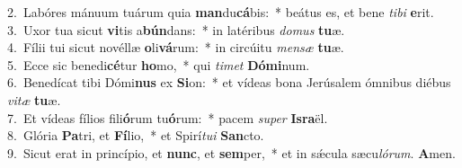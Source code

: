 {2.~}Labóres mánuum tuárum quia \textbf{man}du\textbf{cá}bis:~* beátus es, et bene \textit{ti}\textit{bi} \textbf{e}rit.\\
{3.~}Uxor tua sicut \textbf{vi}tis a\textbf{bún}dans:~* in latéribus \textit{do}\textit{mus} \textbf{tu}æ.\\
{4.~}Fílii tui sicut novéllæ \textbf{o}li\textbf{vá}rum:~* in circúitu \textit{men}\textit{sæ} \textbf{tu}æ.\\
{5.~}Ecce sic benedi\textbf{cé}tur \textbf{ho}mo,~* qui \textit{ti}\textit{met} \textbf{Dó}\textbf{mi}num.\\
{6.~}Benedícat tibi Dómi\textbf{nus} ex \textbf{Si}on:~* et vídeas bona Jerúsalem ómnibus diébus \textit{vi}\textit{tæ} \textbf{tu}æ.\\
{7.~}Et vídeas fílios fili\textbf{ó}rum tu\textbf{ó}rum:~* pacem \textit{su}\textit{per} \textbf{Is}\textbf{ra}ël.\\
{8.~}Glória \textbf{Pa}tri, et \textbf{Fí}lio,~* et Spirí\textit{tu}\textit{i} \textbf{San}cto.\\
{9.~}Sicut erat in princípio, et \textbf{nunc}, et \textbf{sem}per,~* et in sǽcula sæcu\textit{ló}\textit{rum}. \textbf{A}men.\\
